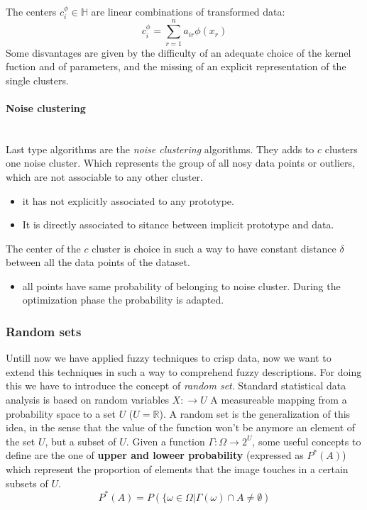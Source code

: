 \documentclass{article}
\begin{document}
The centers $c_i^\phi\in\mathbb{H}$ are linear combinations of transformed data:
$$c_i^\phi=\sum_{r=1}^n a_{ir}\phi(x_r)$$
Some disvantages are given by the difficulty of an adequate choice of the kernel fuction and of
parameters, and the missing of an explicit representation of the single clusters.

\paragraph{Noise clustering}\mbox{}\\
Last type algorithms are the \textit{noise clustering} algorithms. They adds to $c$ clusters
one noise cluster.
Which represents the group of all nosy data points or outliers, which
are not associable to any other cluster.
\begin{itemize}
    \item it has not explicitly associated to any
          prototype.
    \item It is directly associated to sitance between implicit prototype and data.
\end{itemize}

The center of the $c$ cluster is choice in such a way to have constant
distance $\delta$ between all the data points of the dataset.
\begin{itemize}
    \item all points have same probability of belonging to noise cluster. During the optimization
          phase the probability is adapted.
\end{itemize}

\subsubsection{Random sets}
Untill now we have applied fuzzy techniques to crisp data, now we want to extend this
techniques in such a way to comprehend fuzzy descriptions. For doing this we have to introduce
the concept of \textit{random set}.
Standard statistical data analysis is based on random variables $X:\rightarrow U$
A measureable mapping from a probability space to a set $U$ ($U=\mathbb{R}$). A random set
is the generalization of this idea, in the sense that the value of the function won't be anymore
an element of the set $U$, but a subset of $U$. Given a function $\Gamma :\Omega\rightarrow 2^U$,
some useful concepts to define are the one of \textbf{upper and loweer probability} (expressed as $P^*(A)$)
which represent the proportion of elements that the image touches in a certain subsets of $U$.
$$P^*(A)=P\left(\{\omega\in\Omega|\Gamma(\omega)\cap A\neq\emptyset\right)$$
\end{document}
